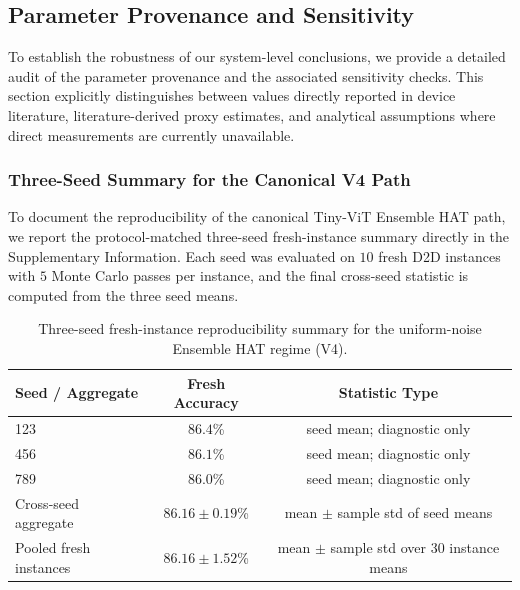 \subsection{Parameter Provenance and Sensitivity}
\label{subsec:parameter-provenance}

To establish the robustness of our system-level conclusions, we provide a detailed audit of the parameter provenance and the associated sensitivity checks. This section explicitly distinguishes between values directly reported in device literature, literature-derived proxy estimates, and analytical assumptions where direct measurements are currently unavailable.

\subsubsection{Three-Seed Summary for the Canonical V4 Path}

To document the reproducibility of the canonical Tiny-ViT Ensemble HAT path, we report the protocol-matched three-seed fresh-instance summary directly in the Supplementary Information. Each seed was evaluated on \(10\) fresh D2D instances with \(5\) Monte Carlo passes per instance, and the final cross-seed statistic is computed from the three seed means.

\begin{table}[ht]
\centering
\caption{Three-seed fresh-instance reproducibility summary for the uniform-noise Ensemble HAT regime (V4).}
\label{tab:v4-three-seed-summary}
\begin{tabular}{lcc}
\toprule
\textbf{Seed / Aggregate} & \textbf{Fresh Accuracy} & \textbf{Statistic Type} \\
\midrule
123 & \(86.4\)\% & seed mean; diagnostic only \\
456 & \(86.1\)\% & seed mean; diagnostic only \\
789 & \(86.0\)\% & seed mean; diagnostic only \\
\midrule
Cross-seed aggregate & \(\mathbf{86.16\pm0.19}\)\% & mean \(\pm\) sample std of seed means \\
Pooled fresh instances & \(86.16\pm1.52\)\% & mean \(\pm\) sample std over 30 instance means \\
\bottomrule
\end{tabular}
\end{table}

\FloatBarrier

